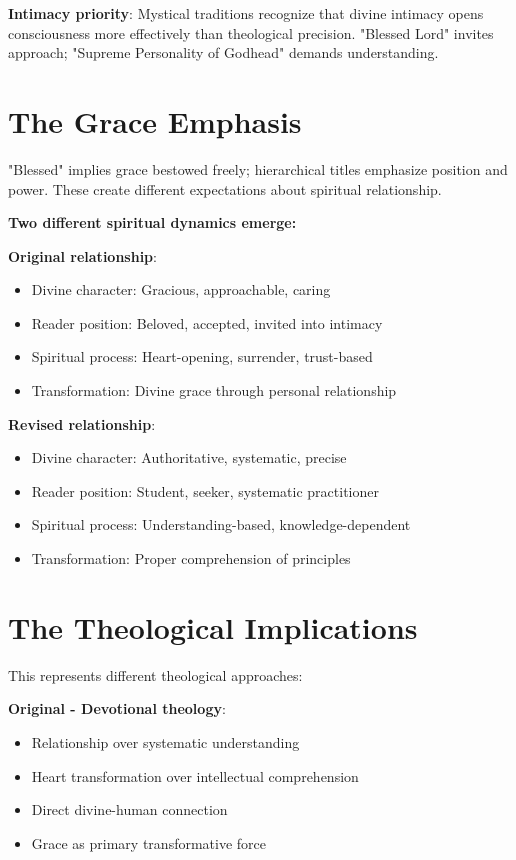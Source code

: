 \documentclass[11pt,twoside]{book}
\begin{document}
\textbf{\textbf{Intimacy priority}}:
Mystical traditions recognize that divine intimacy opens consciousness more effectively than theological precision. "Blessed Lord" invites approach; "Supreme Personality of Godhead" demands understanding.
\section*{The Grace Emphasis}
\label{sec:org12b19f8}
"Blessed" implies grace bestowed freely; hierarchical titles emphasize position and power. These create different expectations about spiritual relationship.

\textbf{\textbf{Two different spiritual dynamics emerge:}}

\textbf{\textbf{Original relationship}}:
\begin{itemize}
\item Divine character: Gracious, approachable, caring
\item Reader position: Beloved, accepted, invited into intimacy
\item Spiritual process: Heart-opening, surrender, trust-based
\item Transformation: Divine grace through personal relationship
\end{itemize}

\textbf{\textbf{Revised relationship}}:
\begin{itemize}
\item Divine character: Authoritative, systematic, precise
\item Reader position: Student, seeker, systematic practitioner
\item Spiritual process: Understanding-based, knowledge-dependent
\item Transformation: Proper comprehension of principles
\end{itemize}
\section*{The Theological Implications}
\label{sec:org282739f}

This represents different theological approaches:

\textbf{\textbf{Original - Devotional theology}}:
\begin{itemize}
\item Relationship over systematic understanding
\item Heart transformation over intellectual comprehension
\item Direct divine-human connection
\item Grace as primary transformative force
\end{itemize}
\end{document}
